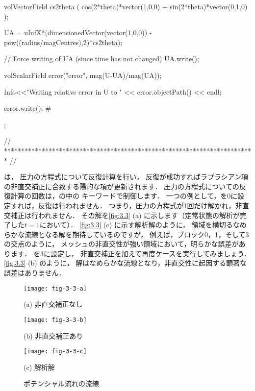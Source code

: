 \begin{OFverbatim}
{{{            volVectorField cs2theta
            (
                cos(2*theta)*vector(1,0,0)
              + sin(2*theta)*vector(0,1,0)
            );

            UA = uInfX*(dimensionedVector(vector(1,0,0))
              - pow((radius/magCentres),2)*cs2theta);

            // Force writing of UA (since time has not changed)
            UA.write();

            volScalarField error("error", mag(U-UA)/mag(UA));

            Info<<"Writing relative error in U to " << error.objectPath()
                << endl;

            error.write();
        #};
    }
}


// ************************************************************************* //
\end{OFverbatim}
は，
圧力の方程式について反復計算を行い，
反復が成功すればラプラシアン項の非直交補正に合致する陽的な項が更新されます．
圧力の方程式についての反復計算の回数は，の中の
キーワードで制御します．
一つの例として，を0に設定すれば，反復は行われません．
つまり，圧力の方程式が1回だけ解かれ，非直交補正は行われません．
その解を\autoref{fig:3.3} (a) に示します（定常状態の解析が完了した$t = 1$において）．
\autoref{fig:3.3} (c) に示す解析解のように，
領域を横切るなめらかな流線となる解を期待しているのですが，
例えば，ブロック0，1，そして3の交点のように，
メッシュの非直交性が強い領域において，明らかな誤差があります．
を3に設定し，
非直交補正を加えて再度ケースを実行してみましょう．
\autoref{fig:3.3} (b) のように，
解はなめらかな流線となり，非直交性に起因する顕著な誤差はありません．


\begin{figure}[p]
 \texttt{[image: fig-3-3-a]}\par
 \medskip
 (a) 非直交補正なし\par
 \bigskip
 \texttt{[image: fig-3-3-b]}\par
 \medskip
 (b) 非直交補正あり\par
 \bigskip
 \texttt{[image: fig-3-3-c]}\par
 \medskip
 (c) 解析解\par
 \medskip
 \caption{ポテンシャル流れの流線}
 \label{fig:3.3}
\end{figure}


